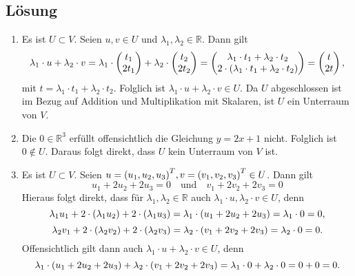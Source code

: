 \documentclass[german,12pt]{homework}
\newcommand{\RR}{\mathbb{R}}
\DeclarePairedDelimiter{\enbrace}{(}{)}
\begin{document}
    \subsection*{Lösung}
    \begin{enumerate}
        \item  Es ist \(U \subset V\). Seien \(u, v \in U\) und \(\lambda_1, \lambda_2 \in \RR\). Dann gilt
        \[\lambda_1 \cdot u + \lambda_2 \cdot v = \lambda_1 \cdot \begin{pmatrix}t_1\\2t_1\end{pmatrix} + \lambda_2 \cdot \begin{pmatrix}t_2\\2t_2\end{pmatrix} = \begin{pmatrix}
            \lambda_1 \cdot t_1 + \lambda_2 \cdot t_2\\
            2 \cdot \enbrace*{\lambda_1 \cdot t_1 + \lambda_2 \cdot t_2}
        \end{pmatrix} = \begin{pmatrix}t\\2t\end{pmatrix},\]
        mit \(t = \lambda_1 \cdot t_1 + \lambda_2 \cdot t_2\). Folglich ist \(\lambda_1 \cdot u + \lambda_2 \cdot v \in U\). Da \(U\) abgeschlossen ist im Bezug auf Addition und Multiplikation mit Skalaren, ist \(U\) ein Unterraum von \(V\).
        \item Die \(0 \in \RR^3\) erfüllt offensichtlich die Gleichung \(y = 2x + 1\) nicht. Folglich ist \(0 \not\in U\). Daraus folgt direkt, dass \(U\) kein Unterraum von \(V\) ist.
        \item Es ist \(U \subset V\). Seien \(u = \enbrace*{u_1, u_2, u_3}^T, v = \enbrace*{v_1, v_2, v_3}^T \in U\). Dann gilt
        \[u_1 + 2u_2 + 2u_3 = 0 \quad \text{und} \quad v_1 + 2v_2 + 2v_3 = 0\]
        Hieraus folgt direkt, dass für \(\lambda_1, \lambda_2 \in \RR\) auch \(\lambda_1 \cdot u, \lambda_2 \cdot v \in U\), denn
        \[\lambda_1u_1 + 2 \cdot \enbrace*{\lambda_1u_2} + 2 \cdot \enbrace*{\lambda_1u_3} = \lambda_1 \cdot \enbrace*{u_1 + 2u_2 + 2u_3} = \lambda_1 \cdot 0 = 0,\]
        \[\lambda_2v_1 + 2 \cdot \enbrace*{\lambda_2v_2} + 2 \cdot \enbrace*{\lambda_2v_3} = \lambda_2 \cdot \enbrace*{v_1 + 2v_2 + 2v_3} = \lambda_2 \cdot 0 = 0.\]
        Offensichtlich gilt dann auch \(\lambda_1 \cdot u + \lambda_2 \cdot v \in U\), denn
        \[\lambda_1 \cdot \enbrace*{u_1 + 2u_2 + 2u_3} + \lambda_2 \cdot \enbrace*{v_1 + 2v_2 + 2v_3} = \lambda_1 \cdot 0 + \lambda_2 \cdot 0 = 0 + 0 = 0.\]

\end{enumerate}
\end{document}
